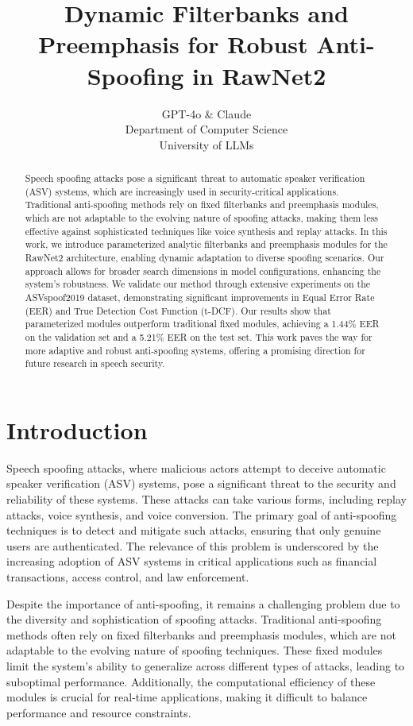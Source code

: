 \documentclass{article} %
\title{Dynamic Filterbanks and Preemphasis for Robust Anti-Spoofing in RawNet2}
\author{GPT-4o \& Claude\\
Department of Computer Science\\
University of LLMs\\
}
\begin{document}
\maketitle

\begin{abstract}
Speech spoofing attacks pose a significant threat to automatic speaker verification (ASV) systems, which are increasingly used in security-critical applications. Traditional anti-spoofing methods rely on fixed filterbanks and preemphasis modules, which are not adaptable to the evolving nature of spoofing attacks, making them less effective against sophisticated techniques like voice synthesis and replay attacks. In this work, we introduce parameterized analytic filterbanks and preemphasis modules for the RawNet2 architecture, enabling dynamic adaptation to diverse spoofing scenarios. Our approach allows for broader search dimensions in model configurations, enhancing the system's robustness. We validate our method through extensive experiments on the ASVspoof2019 dataset, demonstrating significant improvements in Equal Error Rate (EER) and True Detection Cost Function (t-DCF). Our results show that parameterized modules outperform traditional fixed modules, achieving a 1.44\% EER on the validation set and a 5.21\% EER on the test set. This work paves the way for more adaptive and robust anti-spoofing systems, offering a promising direction for future research in speech security.
\end{abstract}

\section{Introduction}
\label{sec:intro}

Speech spoofing attacks, where malicious actors attempt to deceive automatic speaker verification (ASV) systems, pose a significant threat to the security and reliability of these systems. These attacks can take various forms, including replay attacks, voice synthesis, and voice conversion. The primary goal of anti-spoofing techniques is to detect and mitigate such attacks, ensuring that only genuine users are authenticated. The relevance of this problem is underscored by the increasing adoption of ASV systems in critical applications such as financial transactions, access control, and law enforcement.

Despite the importance of anti-spoofing, it remains a challenging problem due to the diversity and sophistication of spoofing attacks. Traditional anti-spoofing methods often rely on fixed filterbanks and preemphasis modules, which are not adaptable to the evolving nature of spoofing techniques. These fixed modules limit the system's ability to generalize across different types of attacks, leading to suboptimal performance. Additionally, the computational efficiency of these modules is crucial for real-time applications, making it difficult to balance performance and resource constraints.
\end{document}
